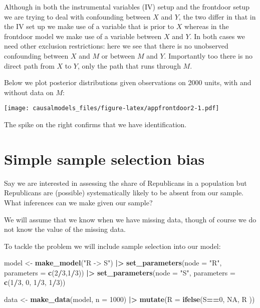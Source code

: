 \documentclass[
  12pt,
]{book}
\newenvironment{Shaded}{\begin{snugshade}}{\end{snugshade}}
\newcommand{\AttributeTok}[1]{\textcolor[rgb]{0.13,0.29,0.53}{#1}}
\newcommand{\ConstantTok}[1]{\textcolor[rgb]{0.56,0.35,0.01}{#1}}
\newcommand{\DecValTok}[1]{\textcolor[rgb]{0.00,0.00,0.81}{#1}}
\newcommand{\FunctionTok}[1]{\textcolor[rgb]{0.13,0.29,0.53}{\textbf{#1}}}
\newcommand{\NormalTok}[1]{#1}
\newcommand{\OtherTok}[1]{\textcolor[rgb]{0.56,0.35,0.01}{#1}}
\newcommand{\SpecialCharTok}[1]{\textcolor[rgb]{0.81,0.36,0.00}{\textbf{#1}}}
\newcommand{\StringTok}[1]{\textcolor[rgb]{0.31,0.60,0.02}{#1}}
\begin{document}
Although in both the instrumental variables (IV) setup and the frontdoor setup we are trying to deal with confounding between \(X\) and \(Y\), the two differ in that in the IV set up we make use of a variable that is prior to \(X\) whereas in the frontdoor model we make use of a variable between \(X\) and \(Y\). In both cases we need other exclusion restrictions: here we see that there is no unobserved confounding between \(X\) and \(M\) or between \(M\) and \(Y\). Importantly too there is no direct path from \(X\) to \(Y\), only the path that runs through \(M\).

Below we plot posterior distributions given observations on 2000 units, with and without data on \(M\):

\texttt{[image: causalmodels\_files/figure-latex/appfrontdoor2-1.pdf]}

The spike on the right confirms that we have identification.

\hypertarget{simple-sample-selection-bias}{%
\section{Simple sample selection bias}\label{simple-sample-selection-bias}}

Say we are interested in assessing the share of Republicans in a population but Republicans are (possible) systematically likely to be absent from our sample. What inferences can we make given our sample?

We will assume that we know when we have missing data, though of course we do not know the value of the missing data.

To tackle the problem we will include sample selection into our model:

\begin{Shaded}
\begin{Highlighting}[]
\NormalTok{model }\OtherTok{\textless{}{-}} \FunctionTok{make\_model}\NormalTok{(}\StringTok{"R {-}\textgreater{} S"}\NormalTok{) }\SpecialCharTok{|\textgreater{}}
  \FunctionTok{set\_parameters}\NormalTok{(}\AttributeTok{node =} \StringTok{"R"}\NormalTok{, }\AttributeTok{parameters =} \FunctionTok{c}\NormalTok{(}\DecValTok{2}\SpecialCharTok{/}\DecValTok{3}\NormalTok{,}\DecValTok{1}\SpecialCharTok{/}\DecValTok{3}\NormalTok{)) }\SpecialCharTok{|\textgreater{}}
  \FunctionTok{set\_parameters}\NormalTok{(}\AttributeTok{node =} \StringTok{"S"}\NormalTok{, }\AttributeTok{parameters =} \FunctionTok{c}\NormalTok{(}\DecValTok{1}\SpecialCharTok{/}\DecValTok{3}\NormalTok{, }\DecValTok{0}\NormalTok{, }\DecValTok{1}\SpecialCharTok{/}\DecValTok{3}\NormalTok{, }\DecValTok{1}\SpecialCharTok{/}\DecValTok{3}\NormalTok{))}

\NormalTok{data }\OtherTok{\textless{}{-}} \FunctionTok{make\_data}\NormalTok{(model, }\AttributeTok{n =} \DecValTok{1000}\NormalTok{) }\SpecialCharTok{|\textgreater{}}
        \FunctionTok{mutate}\NormalTok{(}\AttributeTok{R =} \FunctionTok{ifelse}\NormalTok{(S}\SpecialCharTok{==}\DecValTok{0}\NormalTok{, }\ConstantTok{NA}\NormalTok{, R ))}
\end{Highlighting}
\end{Shaded}
\end{document}

